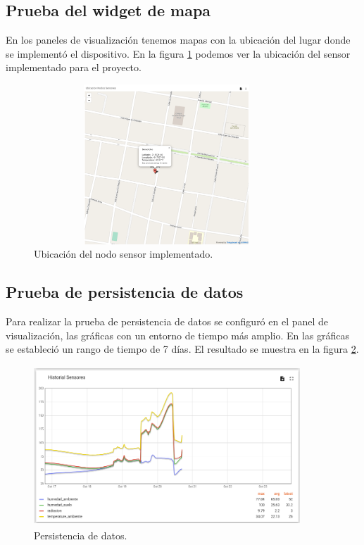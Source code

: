 \subsection{Prueba del widget de mapa}
En los paneles de visualización tenemos mapas con la ubicación del lugar donde se implementó el dispositivo.
En la figura \ref{fig:map thingsboard}  podemos ver la ubicación del sensor implementado para el proyecto.

\begin{figure}[h!]
  \centering
    \includegraphics[width=10cm, height=6cm]{./Figures/map.png}
  \caption{Ubicación del nodo sensor implementado.}
    \label{fig:map thingsboard}
\end{figure}

\subsection{Prueba de persistencia de datos}
Para realizar la prueba de persistencia de datos se configuró en el panel de visualización, las gráficas con un entorno de tiempo más amplio.
En las gráficas se estableció un rango de tiempo de 7 días. El resultado se muestra en la figura \ref{fig:Persistencia de datos}.

\begin{figure}[h!]
  \centering
    \includegraphics[width=10cm, height=6cm]{./Figures/historial_sensores.png}
  \caption{Persistencia de datos.}
    \label{fig:Persistencia de datos}
\end{figure}

